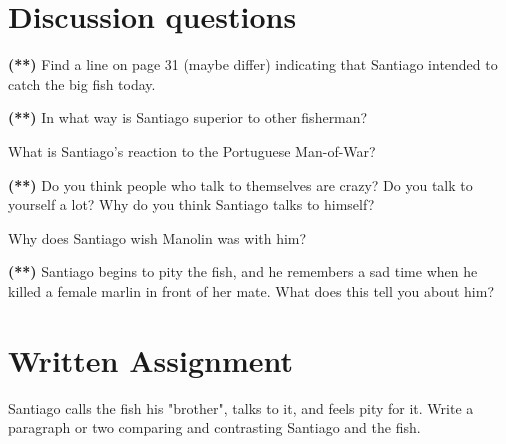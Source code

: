 \documentclass[12pt]{article} %
\begin{document}
\section*{Discussion questions}
\begin{qstn}
  \textbf{(**)} Find a line on page 31 (maybe differ) indicating that Santiago intended to catch the big fish today. 
\end{qstn}


\begin{qstn}
  \textbf{(**)} In what way is Santiago superior to other fisherman?
\end{qstn}


\begin{qstn}
  What is Santiago's reaction to the Portuguese Man-of-War?
\end{qstn}


\begin{qstn}
 \textbf{(**)} Do you think people who talk to themselves are crazy? Do you talk to yourself a lot? Why do you think Santiago talks to himself?
\end{qstn}

\begin{qstn}
  Why does Santiago wish Manolin was with him?
\end{qstn}

\begin{qstn}
\textbf{(**)} Santiago begins to pity the fish, and he remembers a sad time when he killed a female 
marlin in front of her mate. What does this tell you about him?
\end{qstn}

\section*{Written Assignment}
Santiago calls the fish his "brother", talks to it, and feels pity for it. Write a paragraph or two comparing 
and contrasting Santiago and the fish.
\end{document}
